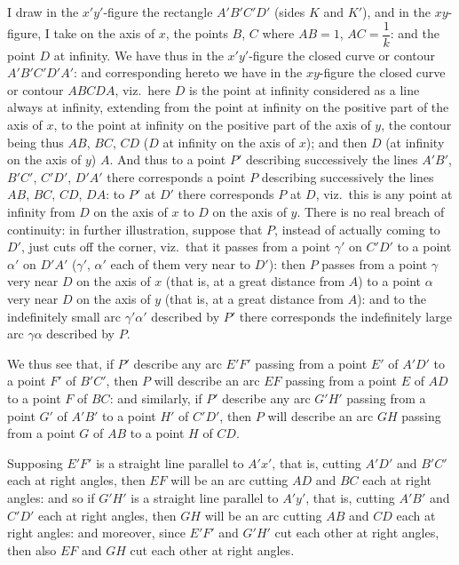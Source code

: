 \documentclass[11pt,a4paper]{article}
\begin{document}
I draw in the $x'y'$-figure the rectangle $A'B'C'D'$ (sides $K$ and $K'$), and in the $xy$-figure, I take on the axis of $x$, the points $B$, $C$ where $AB=1$, $AC=\dfrac{1}{k}$: and the point $D$ at infinity. We have thus in the $x'y'$-figure the closed curve or contour $A'B'C'D'A'$: and corresponding hereto we have in the $xy$-figure the closed curve or contour $ABCDA$, viz.\ here $D$ is the point at infinity considered as a line always at infinity, extending from the point at infinity on the positive part of the axis of $x$, to the point at infinity on the positive part of the axis of $y$, the contour being thus $AB$, $BC$, $CD$ ($D$ at infinity on the axis of $x$); and then $D$ (at infinity on the axis of $y$) $A$. And thus to a point $P'$ describing successively the lines $A'B'$, $B'C'$, $C'D'$, $D'A'$ there corresponds a point $P$ describing successively the lines $AB$, $BC$, $CD$, $DA$: to $P'$ at $D'$ there corresponds $P$ at $D$, viz.\ this is any point at infinity from $D$ on the axis of $x$ to $D$ on the axis of $y$. There is no real breach of continuity: in further illustration, suppose that $P$, instead of actually coming to $D'$, just cuts off the corner, viz.\ that it passes from a point $\gamma'$ on $C'D'$ to a point $\alpha'$ on $D'A'$ ($\gamma'$, $\alpha'$ each of them very near to $D'$): then $P$ passes from a point $\gamma$ very near $D$ on the axis of $x$ (that is, at a great distance from $A$) to a point $\alpha$ very near $D$ on the axis of $y$ (that is, at a great distance from $A$): and to the indefinitely small arc $\gamma'\alpha'$ described by $P'$ there corresponds the indefinitely large arc $\gamma\alpha$ described by $P$.

We thus see that, if $P'$ describe any arc $E'F'$ passing from a point $E'$ of $A'D'$ to a point $F'$ of $B'C'$, then $P$ will describe an arc $EF$ passing from a point $E$ of $AD$ to a point $F$ of $BC$: and similarly, if $P'$ describe any arc $G'H'$ passing from a point $G'$ of $A'B'$ to a point $H'$ of $C'D'$, then $P$ will describe an arc $GH$ passing from a point $G$ of $AB$ to a point $H$ of $CD$.

Supposing $E'F'$ is a straight line parallel to $A'x'$, that is, cutting $A'D'$ and $B'C'$ each at right angles, then $EF$ will be an arc cutting $AD$ and $BC$ each at right angles: and so if $G'H'$ is a straight line parallel to $A'y'$, that is, cutting $A'B'$ and $C'D'$ each at right angles, then $GH$ will be an arc cutting $AB$ and $CD$ each at right angles: and moreover, since $E'F'$ and $G'H'$ cut each other at right angles, then also $EF$ and $GH$ cut each other at right angles.
\end{document}
